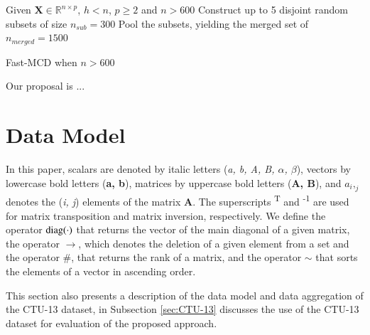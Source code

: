 \documentclass[review]{elsarticle}
\begin{document}
\begin{algorithm}
	\label{alg:alg04}
	\scriptsize
	\SetAlgoLined
	Given $\boldsymbol{X} \in \mathbb{R}^{n \times p}$, $h < n$, $p \geq 2$ and $n > 600$\;
	Construct up to 5 disjoint random subsets of size $n_{sub} = 300$\;
	Pool the subsets, yielding the merged set of $n_{merged} = 1500$\;
	\caption{Fast-MCD when $n > 600$}
\end{algorithm}

Our proposal is ...

\section{Data Model}
\label{sec:datamodel}

In this paper, scalars are denoted by italic letters (\emph{a, b, A, B, $α$, $β$}), vectors by lowercase bold letters (\textbf{a, b}), matrices by uppercase bold letters (\textbf{A, B}), and $a_i,_j$ denotes the (\emph{i, j}) elements of the matrix \textbf{A}. The superscripts \textsuperscript{T} and \textsuperscript{-1} are used for matrix transposition and matrix inversion, respectively. We define the operator $\rm diag(\cdot)$ that returns the vector of the main diagonal of a given matrix, the operator $\rightarrow$, which denotes the deletion of a given element from a set and the operator $\#$, that returns the rank of a matrix, and the operator $\sim$ that sorts the elements of a vector in ascending order.

This section also presents a description of the data model and data aggregation of the CTU-13 dataset, in Subsection \ref{sec:CTU-13} discusses the use of the CTU-13 dataset for evaluation of the proposed approach.
\end{document}
